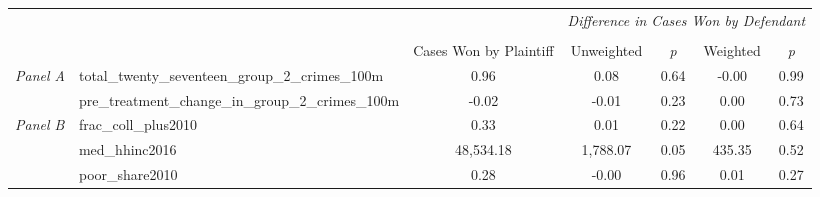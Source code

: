\begin{tabular}{llccccc}
\toprule
 &  & \textit{} & \multicolumn{4}{c}{\textit{Difference in Cases Won by Defendant}} \\
\cline{4-7}
\\
 &  & Cases Won by Plaintiff & Unweighted & \emph{p} & Weighted & \emph{p} \\
\midrule
\multirow[c]{2}{3cm}{\textit{Panel A}} & total_twenty_seventeen_group_2_crimes_100m & 0.96 & 0.08 & 0.64 & -0.00 & 0.99 \\
 & pre_treatment_change_in_group_2_crimes_100m & -0.02 & -0.01 & 0.23 & 0.00 & 0.73 \\
\cline{1-7}
\multirow[c]{3}{3cm}{\textit{Panel B}} & frac_coll_plus2010 & 0.33 & 0.01 & 0.22 & 0.00 & 0.64 \\
 & med_hhinc2016 & 48,534.18 & 1,788.07 & 0.05 & 435.35 & 0.52 \\
 & poor_share2010 & 0.28 & -0.00 & 0.96 & 0.01 & 0.27 \\
\cline{1-7}
\bottomrule
\end{tabular}
